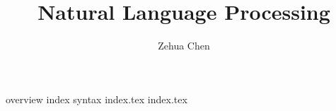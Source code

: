 \documentclass[letterpaper, 11pt]{report}
\title{Natural Language Processing}
\author{Zehua Chen}
\begin{document}
  \maketitle
  \tableofcontents

  {overview}
  {index}
  {syntax}
  {index.tex}
  {index.tex}
\end{document}
